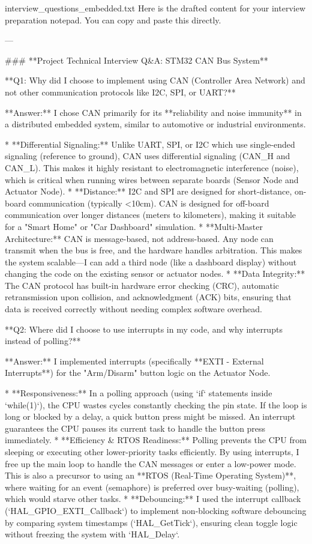 \begin{filecontents*}{interview_questions_embedded.txt}
Here is the drafted content for your interview preparation notepad. You can copy and paste this directly.

---

### **Project Technical Interview Q&A: STM32 CAN Bus System**

**Q1: Why did I choose to implement using CAN (Controller Area Network) and not other communication protocols like I2C, SPI, or UART?**

**Answer:**
I chose CAN primarily for its **reliability and noise immunity** in a distributed embedded system, similar to automotive or industrial environments.

* **Differential Signaling:** Unlike UART, SPI, or I2C which use single-ended signaling (reference to ground), CAN uses differential signaling (CAN_H and CAN_L). This makes it highly resistant to electromagnetic interference (noise), which is critical when running wires between separate boards (Sensor Node and Actuator Node).
* **Distance:** I2C and SPI are designed for short-distance, on-board communication (typically <10cm). CAN is designed for off-board communication over longer distances (meters to kilometers), making it suitable for a "Smart Home" or "Car Dashboard" simulation.
* **Multi-Master Architecture:** CAN is message-based, not address-based. Any node can transmit when the bus is free, and the hardware handles arbitration. This makes the system scalable—I can add a third node (like a dashboard display) without changing the code on the existing sensor or actuator nodes.
* **Data Integrity:** The CAN protocol has built-in hardware error checking (CRC), automatic retransmission upon collision, and acknowledgment (ACK) bits, ensuring that data is received correctly without needing complex software overhead.

**Q2: Where did I choose to use interrupts in my code, and why interrupts instead of polling?**

**Answer:**
I implemented interrupts (specifically **EXTI - External Interrupts**) for the "Arm/Disarm" button logic on the Actuator Node.

* **Responsiveness:** In a polling approach (using `if` statements inside `while(1)`), the CPU wastes cycles constantly checking the pin state. If the loop is long or blocked by a delay, a quick button press might be missed. An interrupt guarantees the CPU pauses its current task to handle the button press immediately.
* **Efficiency & RTOS Readiness:** Polling prevents the CPU from sleeping or executing other lower-priority tasks efficiently. By using interrupts, I free up the main loop to handle the CAN messages or enter a low-power mode. This is also a precursor to using an **RTOS (Real-Time Operating System)**, where waiting for an event (semaphore) is preferred over busy-waiting (polling), which would starve other tasks.
* **Debouncing:** I used the interrupt callback (`HAL_GPIO_EXTI_Callback`) to implement non-blocking software debouncing by comparing system timestamps (`HAL_GetTick`), ensuring clean toggle logic without freezing the system with `HAL_Delay`.


\end{filecontents*}

